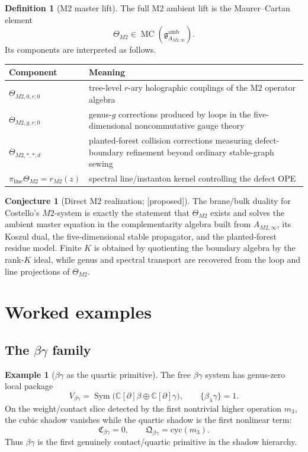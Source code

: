 \documentclass[11pt,oneside]{memoir}
\numberwithin{equation}{chapter}
\theoremstyle{definition}
\newtheorem{definition}[theorem]{Definition}
\newtheorem{conjecture}[theorem]{Conjecture}
\newtheorem{example}[theorem]{Example}
\newcommand{\ClaimStatusConjectured}{\textnormal{[proposed]}}
\newcommand{\C}{\mathbb C}
\newcommand{\fg}{\mathfrak g}
\newcommand{\la}{\lambda}
\newcommand{\cyc}{\mathrm{cyc}}
\newcommand{\MC}{\operatorname{MC}}
\newcommand{\Sym}{\operatorname{Sym}}
\begin{document}
\begin{definition}[M2 master lift]
\label{def:m2-master-lift}
The full M2 ambient lift is the Maurer--Cartan element
\[
\Theta_{M2}\in \MC(\fg^{\mathrm{amb}}_{A_{M2,\infty}}).
\]
Its components are interpreted as follows.
\begin{center}
\begin{tabular}{@{}p{}p{}@{}}
\toprule
Component & Meaning \\
\midrule
\(\Theta_{M2,0,r;0}\) & tree-level \(r\)-ary holographic couplings of the M2 operator algebra \\
\(\Theta_{M2,g,r;0}\) & genus-\(g\) corrections produced by loops in the five-dimensional noncommutative gauge theory \\
\(\Theta_{M2,\ast,\ast;d}\) & planted-forest collision corrections measuring defect-boundary refinement beyond ordinary stable-graph sewing \\
\(\pi_{\mathrm{line}}\Theta_{M2}=r_{M2}(z)\) & spectral line/instanton kernel controlling the defect OPE \\
\bottomrule
\end{tabular}
\end{center}
\end{definition}

\begin{conjecture}[Direct M2 realization; \ClaimStatusConjectured]
\label{conj:m2-direct-realization}
The brane/bulk duality for Costello's \(M2\)-system is exactly the statement that \(\Theta_{M2}\) exists and solves the ambient master equation in the complementarity algebra built from \(A_{M2,\infty}\), its Koszul dual, the five-dimensional stable propagator, and the planted-forest residue model.  Finite \(K\) is obtained by quotienting the boundary algebra by the rank-\(K\) ideal, while genus and spectral transport are recovered from the loop and line projections of \(\Theta_{M2}\).
\end{conjecture}

\section{Worked examples}

\subsection{The \texorpdfstring{$\beta\gamma$}{beta-gamma} family}

\begin{example}[\(\beta\gamma\) as the quartic primitive]
The free \(\beta\gamma\) system has genus-zero local package
\[
V_{\beta\gamma}=\Sym\bigl(\C[\partial]\beta\oplus \C[\partial]\gamma\bigr),
\qquad
\{\beta_\la\gamma\}=1.
\]
On the weight/contact slice detected by the first nontrivial higher operation \(m_3\), the cubic shadow vanishes while the quartic shadow is the first nonlinear term:
\[
\mathfrak C_{\beta\gamma}=0,
\qquad
\mathfrak Q_{\beta\gamma}=\cyc(m_3).
\]
Thus \(\beta\gamma\) is the first genuinely contact/quartic primitive in the shadow hierarchy.
\end{example}
\end{document}
